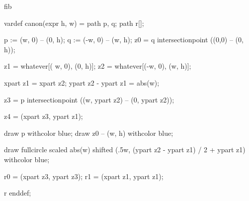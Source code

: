 %
%
%


\startenvironment fib

	\startMPdefinitions
		vardef canon(expr h, w) =
			path p, q;
			path r[];

			p := (w,  0) -- (0, h); %
			q := (-w, 0) -- (w, h); %
			z0 = q intersectionpoint ((0,0) -- (0, h)); %

			z1 = whatever[( w, 0), (0, h)]; %
			z2 = whatever[(-w, 0), (w, h)]; %

			xpart z1 = xpart z2;
			ypart z2 - ypart z1 = abs(w);

			z3 = p intersectionpoint ((w, ypart z2) -- (0, ypart z2)); %

			z4 = (xpart z3, ypart z1); %

			draw p withcolor blue;
			draw z0 -- (w, h) withcolor blue;

			draw fullcircle scaled abs(w) shifted (.5w, (ypart z2 - ypart z1) / 2 + ypart z1) withcolor blue;



			r0 = (xpart z3, ypart z3); %
			r1 = (xpart z1, ypart z1); %

			r
		enddef;
	\stopMPdefinitions

\stopenvironment

